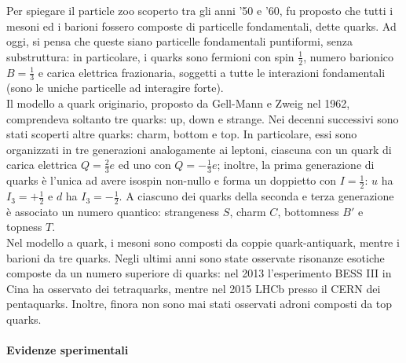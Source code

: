 Per spiegare il particle zoo scoperto tra gli anni '50 e '60, fu proposto che tutti i mesoni ed i barioni fossero composte di particelle fondamentali, dette quarks. Ad oggi, si pensa che queste siano particelle fondamentali puntiformi, senza substruttura: in particolare, i quarks sono fermioni con spin $ \frac{1}{2} $, numero barionico $ B = \frac{1}{3} $ e carica elettrica frazionaria, soggetti a tutte le interazioni fondamentali (sono le uniche particelle ad interagire forte).\\
Il modello a quark originario, proposto da Gell-Mann e Zweig nel 1962, comprendeva soltanto tre quarks: up, down e strange. Nei decenni successivi sono stati scoperti altre quarks: charm, bottom e top. In particolare, essi sono organizzati in tre generazioni analogamente ai leptoni, ciascuna con un quark di carica elettrica $ Q = \frac{2}{3} e $ ed uno con $ Q = -\frac{1}{3} e $; inoltre, la prima generazione di quarks è l'unica ad avere isospin non-nullo e forma un doppietto con $ I = \frac{1}{2} $: $ u $ ha $ I_3 = +\frac{1}{2} $ e $ d $ ha $ I_3 = -\frac{1}{2} $. A ciascuno dei quarks della seconda e terza generazione è associato un numero quantico: strangeness $ S $, charm $ C $, bottomness $ B' $ e topness $ T $.\\
Nel modello a quark, i mesoni sono composti da coppie quark-antiquark, mentre i barioni da tre quarks. Negli ultimi anni sono state osservate risonanze esotiche composte da un numero superiore di quarks: nel 2013 l'esperimento BESS III in Cina ha osservato dei tetraquarks, mentre nel 2015 LHCb presso il CERN dei pentaquarks. Inoltre, finora non sono mai stati osservati adroni composti da top quarks.

\paragraph{Evidenze sperimentali}

